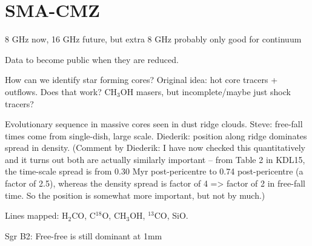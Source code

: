 \section{SMA-CMZ}
8 GHz now, 16 GHz future, but extra 8 GHz probably only good for continuum

Data to become public when they are reduced.

How can we identify star forming cores?  Original idea: hot core tracers + outflows.  Does that work? CH$_3$OH masers, but incomplete/maybe just shock tracers?

Evolutionary sequence in massive cores seen in dust ridge clouds.  Steve: free-fall times come from single-dish, large scale.  Diederik: position along ridge dominates spread in density. (Comment by Diederik: I have now checked this quantitatively and it turns out both are actually similarly important -- from Table 2 in KDL15, the time-scale spread is from 0.30 Myr post-pericentre to 0.74 post-pericentre (a factor of 2.5), whereas the density spread is factor of 4 => factor of 2 in free-fall time. So the position is somewhat more important, but not by much.)

Lines mapped: H$_2$CO, C$^{18}$O, CH$_3$OH, $^{13}$CO, SiO.

Sgr B2: Free-free is still dominant at 1mm